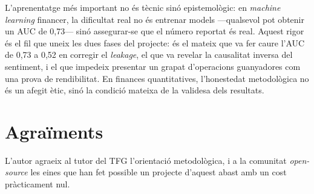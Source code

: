 \documentclass[10pt,twocolumn,a4paper]{article}
\begin{document}
L'aprenentatge més important no és tècnic sinó epistemològic: en \textit{machine
learning} financer, la dificultat real no és entrenar models ---qualsevol pot
obtenir un AUC de 0,73--- sinó assegurar-se que el número reportat és real. Aquest
rigor és el fil que uneix les dues fases del projecte: és el mateix que va fer caure
l'AUC de 0,73 a 0,52 en corregir el \textit{leakage}, el que va revelar la
causalitat inversa del sentiment, i el que impedeix presentar un grapat
d'operacions guanyadores com una prova de rendibilitat. En finances quantitatives,
l'honestedat metodològica no és un afegit ètic, sinó la condició mateixa de la
validesa dels resultats.

\section*{Agraïments}
L'autor agraeix al tutor del TFG l'orientació metodològica, i a la comunitat
\textit{open-source} les eines que han fet possible un projecte d'aquest abast amb
un cost pràcticament nul.
\end{document}
